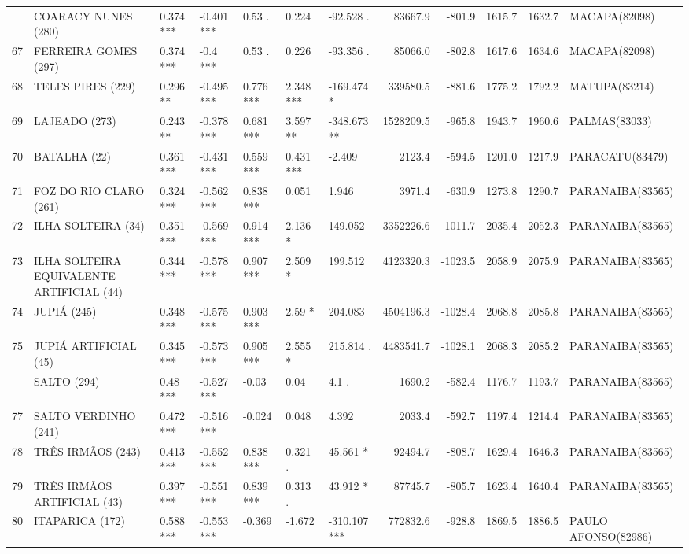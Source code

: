 \documentclass[12pt,oneside]{book}\usepackage[]{graphicx}\usepackage[]{color}
\newenvironment{knitrout}{}{} %
\theoremstyle{definition} %
\begin{document}
\begin{knitrout}
\begin{landscape}
\begin{table}
{\begin{tabular}[t]{lllllllrrrrl}
\addlinespace
66 & COARACY NUNES (280) & 0.374 *** & -0.401 *** & 0.53 . & 0.224 & -92.528 . & 83667.9 & -801.9 & 1615.7 & 1632.7 & MACAPA(82098)\\
\rowcolor{gray!6}  67 & FERREIRA GOMES (297) & 0.374 *** & -0.4 *** & 0.53 . & 0.226 & -93.356 . & 85066.0 & -802.8 & 1617.6 & 1634.6 & MACAPA(82098)\\
68 & TELES PIRES (229) & 0.296 ** & -0.495 *** & 0.776 *** & 2.348 *** & -169.474 * & 339580.5 & -881.6 & 1775.2 & 1792.2 & MATUPA(83214)\\
\rowcolor{gray!6}  69 & LAJEADO (273) & 0.243 ** & -0.378 *** & 0.681 *** & 3.597 ** & -348.673 ** & 1528209.5 & -965.8 & 1943.7 & 1960.6 & PALMAS(83033)\\
70 & BATALHA (22) & 0.361 *** & -0.431 *** & 0.559 *** & 0.431 *** & -2.409 & 2123.4 & -594.5 & 1201.0 & 1217.9 & PARACATU(83479)\\
\addlinespace
\rowcolor{gray!6}  71 & FOZ DO RIO CLARO (261) & 0.324 *** & -0.562 *** & 0.838 *** & 0.051 & 1.946 & 3971.4 & -630.9 & 1273.8 & 1290.7 & PARANAIBA(83565)\\
72 & ILHA SOLTEIRA (34) & 0.351 *** & -0.569 *** & 0.914 *** & 2.136 * & 149.052 & 3352226.6 & -1011.7 & 2035.4 & 2052.3 & PARANAIBA(83565)\\
\rowcolor{gray!6}  73 & ILHA SOLTEIRA EQUIVALENTE ARTIFICIAL (44) & 0.344 *** & -0.578 *** & 0.907 *** & 2.509 * & 199.512 & 4123320.3 & -1023.5 & 2058.9 & 2075.9 & PARANAIBA(83565)\\
74 & JUPIÁ (245) & 0.348 *** & -0.575 *** & 0.903 *** & 2.59 * & 204.083 & 4504196.3 & -1028.4 & 2068.8 & 2085.8 & PARANAIBA(83565)\\
\rowcolor{gray!6}  75 & JUPIÁ ARTIFICIAL (45) & 0.345 *** & -0.573 *** & 0.905 *** & 2.555 * & 215.814 . & 4483541.7 & -1028.1 & 2068.3 & 2085.2 & PARANAIBA(83565)\\
\addlinespace
76 & SALTO (294) & 0.48 *** & -0.527 *** & -0.03 & 0.04 & 4.1 . & 1690.2 & -582.4 & 1176.7 & 1193.7 & PARANAIBA(83565)\\
\rowcolor{gray!6}  77 & SALTO VERDINHO (241) & 0.472 *** & -0.516 *** & -0.024 & 0.048 & 4.392 & 2033.4 & -592.7 & 1197.4 & 1214.4 & PARANAIBA(83565)\\
78 & TRÊS IRMÃOS (243) & 0.413 *** & -0.552 *** & 0.838 *** & 0.321 . & 45.561 * & 92494.7 & -808.7 & 1629.4 & 1646.3 & PARANAIBA(83565)\\
\rowcolor{gray!6}  79 & TRÊS IRMÃOS ARTIFICIAL (43) & 0.397 *** & -0.551 *** & 0.839 *** & 0.313 . & 43.912 * & 87745.7 & -805.7 & 1623.4 & 1640.4 & PARANAIBA(83565)\\
80 & ITAPARICA (172) & 0.588 *** & -0.553 *** & -0.369 & -1.672 & -310.107 *** & 772832.6 & -928.8 & 1869.5 & 1886.5 & PAULO AFONSO(82986)\\
\bottomrule
\end{tabular}}
\end{table}
\end{landscape}


\end{knitrout}
\end{document}

